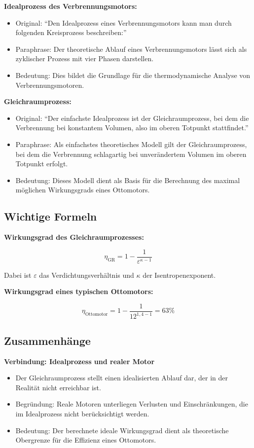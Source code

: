 \documentclass[a4paper,12pt]{article}
\begin{document}
\textbf{Idealprozess des Verbrennungsmotors:}

\begin{itemize}
    \item Original: \enquote{Den Idealprozess eines Verbrennungsmotors kann man durch folgenden Kreisprozess beschreiben:}
    \item Paraphrase: Der theoretische Ablauf eines Verbrennungsmotors lässt sich als zyklischer Prozess mit vier Phasen darstellen.
    \item Bedeutung: Dies bildet die Grundlage für die thermodynamische Analyse von Verbrennungsmotoren.
\end{itemize}

\textbf{Gleichraumprozess:}

\begin{itemize}
    \item Original: \enquote{Der einfachste Idealprozess ist der Gleichraumprozess, bei dem die Verbrennung bei konstantem Volumen, also im oberen Totpunkt stattfindet.}
    \item Paraphrase: Als einfachstes theoretisches Modell gilt der Gleichraumprozess, bei dem die Verbrennung schlagartig bei unverändertem Volumen im oberen Totpunkt erfolgt.
    \item Bedeutung: Dieses Modell dient als Basis für die Berechnung des maximal möglichen Wirkungsgrads eines Ottomotors.
\end{itemize}

\subsection{Wichtige Formeln}

\textbf{Wirkungsgrad des Gleichraumprozesses:}

$$ \eta_{\mathrm{GR}} = 1 - \frac{1}{\varepsilon^{\kappa-1}} $$

Dabei ist $\varepsilon$ das Verdichtungsverhältnis und $\kappa$ der Isentropenexponent.

\textbf{Wirkungsgrad eines typischen Ottomotors:}

$$ \eta_{\text{Ottomotor}} = 1 - \frac{1}{12^{1,4-1}} = 63\% $$

\subsection{Zusammenhänge}

\textbf{Verbindung: Idealprozess und realer Motor}

\begin{itemize}
    \item Der Gleichraumprozess stellt einen idealisierten Ablauf dar, der in der Realität nicht erreichbar ist.
    \item Begründung: Reale Motoren unterliegen Verlusten und Einschränkungen, die im Idealprozess nicht berücksichtigt werden.
    \item Bedeutung: Der berechnete ideale Wirkungsgrad dient als theoretische Obergrenze für die Effizienz eines Ottomotors.
\end{itemize}
\end{document}
